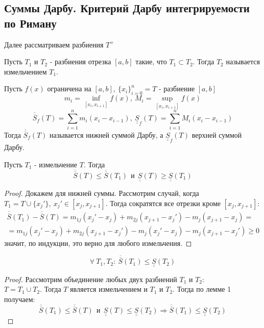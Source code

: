 \subsection{Суммы Дарбу. Критерий Дарбу интегрируемости по Риману}
Далее рассматриваем разбиения $T^+$
\begin{definition}
    Пусть $T_{1}$ и $T_{2}$ - разбиения отрезка $[a,b]$ такие, что $T_1\subset T_2$. Тогда $T_2$ называется измельчением $T_1$.
\end{definition} 
\begin{definition}
    Пусть $f(x)$ ограничена на $[a,b],\ \{x_i\}_{i=0}^n=T$ - разбиение $[a,b]$
    \[m_i=\inf\limits_{[x_i, x_{i+1}]} f(x),\ M_i=\sup\limits_{[x_i, x_{i+1}]}f(x)\] 
    \[\overline{\overline{S}}_f(T)=\sum\limits_{i=1}^{n}m_i(x_{i}-x_{i-1}),\ \underline{\underline{S}}_f(T)=\sum\limits_{i=1}^{n}M_i(x_{i}-x_{i-1})\]
    Тогда $\overline{\overline{S}}_f(T)$ называется нижней суммой Дарбу, а $\underline{\underline{S}}_f(T)$ верхней суммой Дарбу.
\end{definition} 
\begin{numlemma}
    Пусть $T_1$ - измельчение $T$. Тогда
    \[\overline{\overline{S}}(T)\leq \overline{\overline{S}}(T_1)\ \ \text{и}\ \ \underline{\underline{S}}(T)\geq \underline{\underline{S}}(T_1)\]
\end{numlemma} 
\begin{proof}
    Докажем для нижней суммы. Рассмотрим случай, когда\\
    $T_1=T\cup \{x_j'\},\ x_j'\in [x_j, x_{j+1}]$. Тогда сократятся все отрезки кроме $[x_j,x_{j+1}]:$
    \begin{multline*}
        \overline{\overline{S}}(T_1)-\overline{\overline{S}}(T)=m_{1j}(x_j'-x_j)+m_{2j}(x_{j+1}-x_j')-m_j(x_{j+1}-x_j)=\\
        =m_{1j}(x_j'-x_j)+m_{2j}(x_{j+1}-x_j')-m_j(x_j'-x_j)-m_j(x_{j+1}-x_j')\geq 0
    \end{multline*}
    значит, по индукции, это верно для любого измельчения.
\end{proof} 
\begin{numlemma}
    \[\forall\ T_1, T_2:\ \overline{\overline{S}}(T_1)\leq \underline{\underline{S}}(T_2)\]
\end{numlemma} 
\begin{proof}
    Рассмотрим объединение любых двух разбиений $T_1$ и $T_2$:\\ $T=T_1\cup T_2$. Тогда $T$ является измельчением и $T_1$ и $T_2$. Тогда по лемме 1 получаем:
    \[\overline{\overline{S}}(T_1)\leq \overline{\overline{S}}(T)\ \ \text{и}\ \ \underline{\underline{S}}(T)\leq \underline{\underline{S}}(T_2) \Rightarrow \overline{\overline{S}}(T_1)\leq \underline{\underline{S}}(T_2)\]
\end{proof} 

